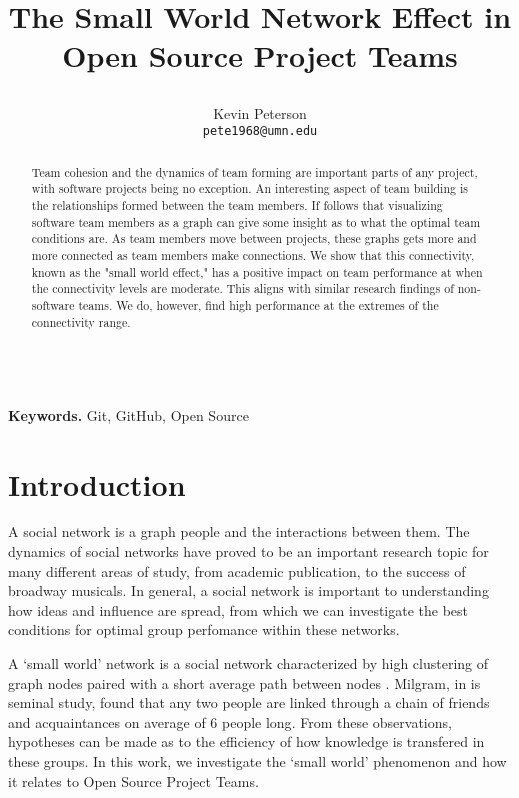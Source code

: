\documentclass{proc}
\title{
The Small World Network Effect in Open Source Project Teams
\author{Kevin Peterson\\
\small \texttt{pete1968@umn.edu}
}
}
\begin{document}
\maketitle

\begin{abstract}
Team cohesion and the dynamics of team forming are important parts of any project, with software projects being no exception. An interesting aspect of team building is the relationships formed between the team members. If follows that visualizing software team members as a graph can give some insight as to what the optimal team conditions are. As team members move between projects, these graphs gets more and more connected as team members make connections. We show that this connectivity, known as the "small world effect," has a positive impact on team performance at when the connectivity levels are moderate. This aligns with similar research findings of non-software teams. We do, however, find high performance at the extremes of the connectivity range.
\end{abstract}

\noindent \\\textbf{Keywords.} Git, GitHub, Open Source

\section{Introduction}
A social network is a graph people and the interactions between them. The dynamics of social networks have proved to be an important research topic for many different areas of study, from academic publication\cite{barabasi2002evolution}, to the success of broadway musicals\cite{uzzi2005collaboration}. In general, a social network is important to understanding how ideas and influence are spread\cite{kempe2003maximizing}, from which we can investigate the best conditions for optimal group perfomance within these networks.

A `small world' network is a social network characterized by high clustering of graph nodes paired with a short average path between nodes \cite{watts1998collective}. Milgram, in is seminal study, found that any two people are linked through a chain of friends and acquaintances on average of 6 people long\cite{milgram1967small}. From these observations, hypotheses can be made as to the efficiency of how knowledge is transfered in these groups\cite{latora2001efficient}. In this work, we investigate the `small world' phenomenon and how it relates to Open Source Project Teams.
\end{document}
